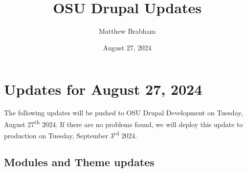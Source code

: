 
\title{OSU Drupal Updates}
\author{Matthew Brabham}
\date{August 27, 2024}

    \maketitle
    \tableofcontents


    \section{Updates for August 27, 2024}
    The following updates will be pushed to OSU Drupal Development on Tuesday, August 27\textsuperscript{th} 2024.
    If there are no problems found, we will deploy this update to production on Tuesday,
    September 3\textsuperscript{rd} 2024.

    \subsection{Modules and Theme updates}

